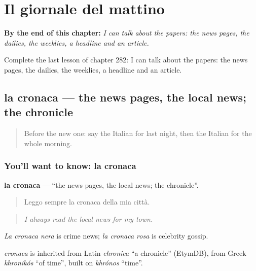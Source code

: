 
\chapter{Il giornale del mattino}
\label{ch:it-il-giornale-del-mattino}

\begin{chapteropening}
\textbf{By the end of this chapter:} \emph{I can talk about the papers: the news pages, the dailies, the weeklies, a headline and an article.}

Complete the last lesson of chapter 282: I can talk about the papers: the news pages, the dailies, the weeklies, a headline and an article.
\end{chapteropening}

\section[la cronaca]{la cronaca — the news pages, the local news; the chronicle}

\label{lesson:IT-C282-cronaca}



\begin{quote}
Before the new one: say the Italian for last night, then the Italian for the whole morning.
\end{quote}

\subsection*{You'll want to know: la cronaca}
\textbf{la cronaca} — \textquotedblleft{}the news pages, the local news; the chronicle\textquotedblright{}.

\begin{quote}
Leggo sempre la cronaca della mia città.
\end{quote}

\begin{quote}
\emph{I always read the local news for my town.}
\end{quote}

\emph{La cronaca nera} is crime news; \emph{la cronaca rosa} is celebrity gossip.

\begin{cousinweb}
\emph{cronaca} is inherited from Latin \emph{chronica} \textquotedblleft{}a chronicle\textquotedblright{} (EtymDB), from Greek \emph{khronikós} \textquotedblleft{}of time\textquotedblright{}, built on \emph{khrónos} \textquotedblleft{}time\textquotedblright{}.
\end{cousinweb}

